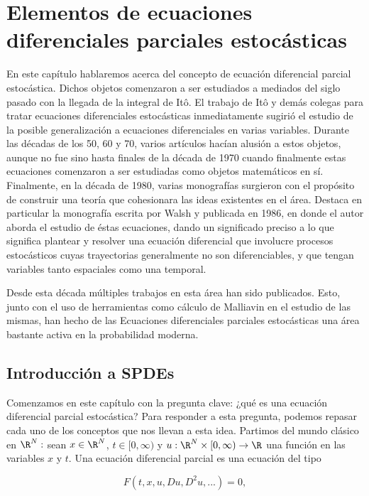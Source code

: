 \chapter{Elementos de ecuaciones diferenciales parciales estocásticas}

En este capítulo hablaremos acerca del concepto de ecuación diferencial parcial estocástica.
Dichos objetos comenzaron a ser estudiados a mediados del siglo pasado con la llegada de la integral de Itô.
El trabajo de Itô y demás colegas para tratar ecuaciones diferenciales estocásticas inmediatamente sugirió el estudio de la posible generalización a ecuaciones diferenciales en varias variables.
Durante las décadas de los 50, 60 y 70, varios artículos hacían alusión a estos objetos, aunque no fue sino hasta finales de la década de 1970 cuando finalmente estas ecuaciones comenzaron a ser estudiadas como objetos matemáticos en sí.
Finalmente, en la década de 1980, varias monografías surgieron con el propósito de construir una teoría que cohesionara las ideas existentes en el área. Destaca en particular la monografía escrita por Walsh \cite{Walsh_J.B_Introduction_to_SPDEs} y publicada en 1986, en donde el autor aborda el estudio de éstas ecuaciones, dando un significado preciso a lo que significa plantear y resolver una ecuación diferencial que involucre procesos estocásticos cuyas trayectorias generalmente no son diferenciables, y que tengan variables tanto espaciales como una temporal.

Desde esta década múltiples trabajos en esta área han sido publicados. Esto, junto con el uso de herramientas como cálculo de Malliavin en el estudio de las mismas, han hecho de las Ecuaciones diferenciales parciales estocásticas una área bastante activa en la probabilidad moderna. 
\section{Introducción a SPDEs}
Comenzamos en este capítulo con la pregunta clave: ¿qué es una ecuación diferencial parcial estocástica? Para responder a esta pregunta, podemos repasar cada uno de los conceptos que nos llevan a esta idea. Partimos del mundo clásico en $\R^{N}:$ sean $x\in \R^{N}$, $t\in [0,\infty)$ y $u:\R^{N}\times[0,\infty)\to \R$ una función en las variables $x$ y $t$. Una ecuación diferencial parcial es una ecuación del tipo 

\begin{equation}\label{ec_dif_parc}
    F(t,x,u,Du,D^2u,...)=0,    
\end{equation}

